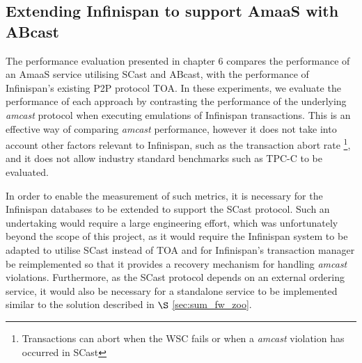     \subsection{Extending Infinispan to support AmaaS with ABcast}
    The performance evaluation presented in chapter 6 compares the performance of an \textsf{AmaaS} service utilising \textsf{SCast} and \textsf{ABcast}, with the performance of Infinispan's existing P2P protocol TOA.  In these experiments, we evaluate the performance of each approach by contrasting the performance of the underlying \emph{amcast} protocol when executing emulations of Infinispan transactions.  This is an effective way of comparing \emph{amcast} performance, however it does not take into account other factors relevant to Infinispan, such as the transaction abort rate \footnote{Transactions can abort when the WSC fails or when a \emph{amcast} violation has occurred in \textsf{SCast}}, and it does not allow industry standard benchmarks such as TPC-C \citep{TPC-C} to be evaluated.  
    
    In order to enable the measurement of such metrics, it is necessary for the Infinispan databases to be extended to support the \textsf{SCast} protocol.  Such an undertaking would require a large engineering effort, which was unfortunately beyond the scope of this project, as it would require the Infinispan system to be adapted to utilise \textsf{SCast} instead of \textsf{TOA} and for Infinispan's transaction manager be reimplemented so that it provides a recovery mechanism for handling \emph{amcast} violations.  Furthermore, as the \textsf{SCast} protocol depends on an external ordering service, it would also be necessary for a standalone service to be implemented similar to the solution described in $\S$ \ref{sec:sum_fw_zoo}.  